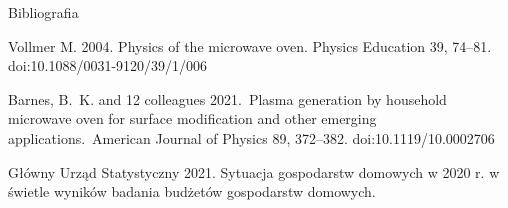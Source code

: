 \documentclass{beamer}
\begin{document}
\begin{frame}{Bibliografia}
\begin{thebibliography}{}
\bibitem[]{}Vollmer M. 2004. Physics of the microwave oven. Physics Education 39, 74--81. doi:10.1088/0031-9120/39/1/006

 Barnes, B.~K. and 12 colleagues 2021.\ Plasma generation by household microwave oven for surface modification and other emerging applications.\ American Journal of Physics 89, 372–382. doi:10.1119/10.0002706 %

\bibitem[]{} Główny Urząd Statystyczny 2021. Sytuacja gospodarstw domowych w 2020 r. w świetle wyników badania budżetów gospodarstw domowych.



\end{thebibliography}
\end{frame}

 
\end{document}
